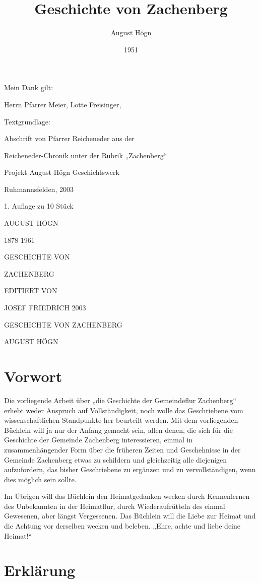 \documentclass[12pt,a4pager]{book}
\author{August Högn}
\title{Geschichte von Zachenberg}
\date{1951}
\begin{document}
\maketitle

Mein Dank gilt:

Herrn Pfarrer Meier, Lotte Freisinger,

Textgrundlage:

Abschrift von Pfarrer Reicheneder aus der

Reicheneder-Chronik unter der Rubrik „Zachenberg“

\tableofcontents

\newpage

Projekt August Högn Geschichtswerk

Ruhmannsfelden, 2003

1. Auflage zu 10 Stück

AUGUST HÖGN

1878 1961


GESCHICHTE VON

ZACHENBERG




EDITIERT VON

JOSEF FRIEDRICH 2003

GESCHICHTE VON ZACHENBERG

AUGUST HÖGN

\part{Vorwort}

Die vorliegende Arbeit über „die Geschichte der Gemeindeflur Zachenberg“ erhebt
weder Anspruch auf Vollständigkeit, noch wolle das Geschriebene vom
wissenschaftlichen Standpunkte her beurteilt werden. Mit dem vorliegenden
Büchlein will ja nur der Anfang gemacht sein, allen denen, die sich für die
Geschichte der Gemeinde Zachenberg interessieren, einmal in zusammenhängender
Form über die früheren Zeiten und Geschehnisse in der Gemeinde Zachenberg etwas
zu schildern und gleichzeitig alle diejenigen aufzufordern, das bisher
Geschriebene zu ergänzen und zu vervollständigen, wenn dies möglich sein sollte.

Im Übrigen will das Büchlein den Heimatgedanken wecken durch Kennenlernen des
Unbekannten in der Heimatflur, durch Wiederaufrütteln des einmal Gewesenen, aber
längst Vergessenen. Das Büchlein will die Liebe zur Heimat und die Achtung vor
derselben wecken und beleben. „Ehre, achte und liebe deine Heimat!“

\part{Erklärung}
\end{document}
